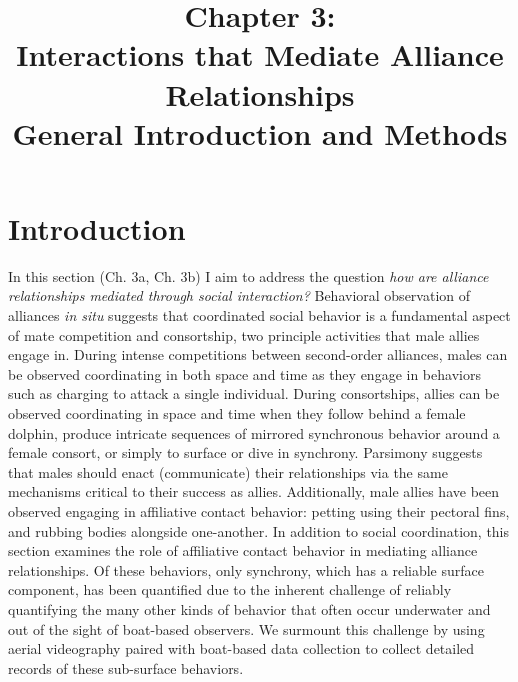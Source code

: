 \documentclass[11pt]{amsart}
\title{Chapter 3: \\ Interactions that Mediate Alliance Relationships \\ General Introduction and Methods}
\date{}
\begin{document}
\maketitle

\section{Introduction}

In this section (Ch. 3a, Ch. 3b) I aim to address the question \emph{how are alliance relationships mediated through social interaction?} 
Behavioral observation of alliances \emph{in situ} suggests that coordinated social behavior is a fundamental aspect of mate competition and consortship, two principle activities that male allies engage in. During intense competitions between second-order alliances, males can be observed coordinating in both space and time as they engage in behaviors such as charging to attack a single individual. During consortships, allies can be observed coordinating in space and time when they follow behind a female dolphin, produce intricate sequences of mirrored synchronous behavior around a female consort, or simply to surface or dive in synchrony.  Parsimony suggests that males should enact (communicate) their relationships via the same mechanisms critical to their success as allies. 
Additionally, male allies have been observed engaging in affiliative contact behavior: petting using their pectoral fins, and rubbing bodies alongside one-another. In addition to social coordination, this section examines the role of affiliative contact behavior in mediating alliance relationships. Of these behaviors, only synchrony, which has a reliable surface component, has been quantified due to the inherent challenge of reliably quantifying the many other kinds of behavior that often occur underwater and out of the sight of boat-based observers. We surmount this challenge by using aerial videography paired with boat-based data collection to collect detailed records of these sub-surface behaviors.
\end{document}
